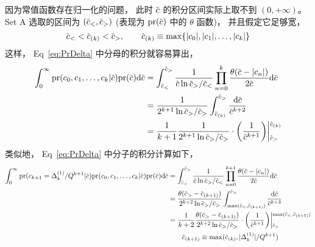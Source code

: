 \documentclass[12pt]{article}
\newcommand*\dmspr{\textrm{pr}}
\newcommand*\dmsvat[3][\big]{#1|_{\raise3pt\hbox{$\scriptstyle#2$}}^{\lower3pt\hbox{$\scriptstyle#3$}}}
\def\dmscbar{\dmsbar{c}}
\def\dmsccck{c_0,c_1,\ldots,c_k}
\def\dmsdeltako{\Delta_k^{(1)}}
\begin{document}
因为常值函数存在归一化的问题，
此时 $\dmscbar$ 的积分区间实际上取不到 $(0,+\infty)$。
Set A 选取的区间为 $(\dmscbar_<,\dmscbar_>)$
(表现为 $\dmspr(\dmscbar)$ 中的 $\theta$ 函数)，
并且假定它足够宽，
\begin{equation}
  \label{eq:4-1}
  \dmscbar_< < \dmscbar_{(k)} < \dmscbar_>,\qquad
  \dmscbar_{(k)}\equiv\max\{|c_0|,|c_1|,\ldots,|c_k|\}
\end{equation}
这样，
Eq~\eqref{eq:PrDelta} 中分母的积分就容易算出，
\begin{equation}
  \label{eq:4-2}
  \begin{aligned}
    \int_0^\infty\dmspr(\dmsccck|\dmscbar)\dmspr(\dmscbar)\mdif\dmscbar
    &=  \int_{\dmscbar_<}^{\dmscbar_>} \frac{1}{\dmscbar\ln\dmscbar_>/\dmscbar_<}
    \prod_{n=0}^{k} \frac{\theta(\dmscbar-|c_n|)}{2\dmscbar}\mdif\dmscbar\\
    &=  \frac{1}{2^{k+1}\ln\dmscbar_>/\dmscbar_>}\int_{\dmscbar_{(k)}}^{\dmscbar_>}
    \frac{\mdif\dmscbar}{\dmscbar^{k+2}} \\
    &= \frac{1}{k+1} \frac{1}{2^{k+1}\ln\dmscbar_>/\dmscbar_>}\cdot\biggl(
    \frac{1}{\dmscbar^{k+1}}\biggr)\dmsvat[\bigg]{\dmscbar_>}{\dmscbar_{(k)}}
  \end{aligned}
\end{equation}
类似地，
Eq~\eqref{eq:PrDelta} 中分子的积分计算如下，
\begin{equation}
  \label{eq:4-3}
  \begin{aligned}
    \int_0^\infty\dmspr(c_{k+1}=\dmsdeltako/Q^{k+1}|\dmscbar)
    \dmspr(\dmsccck|\dmscbar)\dmspr(\dmscbar)\mdif\dmscbar
    &= \int_{\dmscbar_<}^{\dmscbar_>} \frac{1}{\dmscbar\ln\dmscbar_>/\dmscbar_<}
    \prod_{n=0}^{k+1}\frac{\theta(\dmscbar-|c_n|)}{2\dmscbar}\mdif\dmscbar\\
    &= \frac{\theta(\dmscbar_>-\dmscbar_{(k+1)})}{2^{k+2}
      \ln\dmscbar_>/\dmscbar_>}\int^{\dmscbar_>}_{\max(\dmscbar_<,\dmscbar_{(k+1)})}
    \frac{\mdif\dmscbar}{\dmscbar^{k+3}} \\
    &= \frac{1}{k+2} \frac{\theta(\dmscbar_>-\dmscbar_{(k+1)})
    }{2^{k+2}\ln\dmscbar_>/\dmscbar_>}\cdot\biggl(
    \frac{1}{\dmscbar^{k+1}}\biggr)\dmsvat[\bigg]{\dmscbar_>}{
      \max(\dmscbar_<,\dmscbar_{(k+1)})}\\
    &\qquad\dmscbar_{(k+1)}\equiv\max(\dmscbar_{(k)},|\dmsdeltako|/Q^{k+1})
  \end{aligned}
\end{equation}
\end{document}
